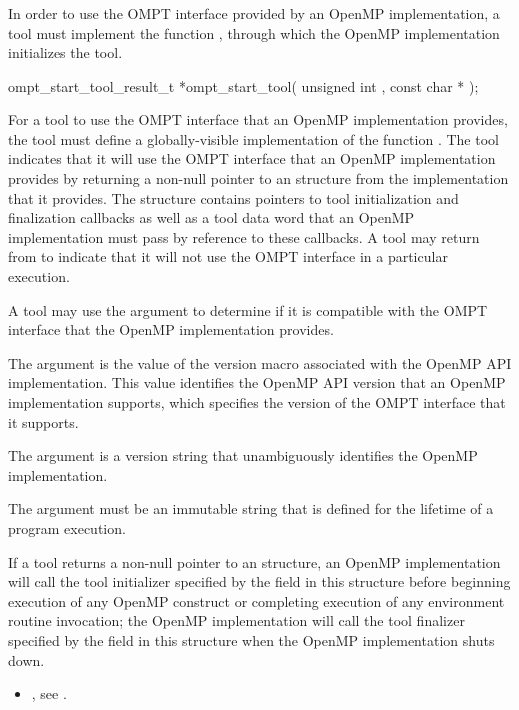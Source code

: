 \subsubsection{}
\label{sec:ompt_start_tool}

\summary
In order to use the OMPT interface provided by an OpenMP implementation,
a tool must implement the function , through which 
the OpenMP implementation initializes the tool.

\format
\begin{cspecific}
\begin{omptOther}
ompt_start_tool_result_t *ompt_start_tool(
  unsigned int ,
  const char *
);
\end{omptOther}
\end{cspecific}

\descr
For a tool to use the OMPT interface that an OpenMP implementation provides,
the tool must define a globally-visible implementation of the
function . The tool indicates that it will use the OMPT 
interface that an OpenMP implementation provides by returning a non-null 
pointer to an  structure from the 
 implementation that it provides. The 
 structure contains pointers to tool 
initialization and finalization callbacks as well as a tool data word 
that an OpenMP implementation must pass by reference to these callbacks. 
A tool may return  from  to indicate 
that it will not use the OMPT interface in a particular execution.

A tool may use the  argument to determine if it is 
compatible with the OMPT interface that the OpenMP implementation provides.

\argdesc
The argument  is the value of the  version macro
associated with the OpenMP API implementation. This value identifies the OpenMP 
API version that an OpenMP implementation supports, which specifies the version 
of the OMPT interface that it supports.

The argument  is a version string that unambiguously 
identifies the OpenMP implementation.

\constraints
The argument  must be an immutable string that is defined 
for the lifetime of a program execution.

\effect
If a tool returns a non-null pointer to an  
structure, an OpenMP implementation will call the tool initializer specified 
by the  field in this structure before beginning execution 
of any OpenMP construct or completing execution of any environment routine 
invocation; the OpenMP implementation will call the tool finalizer specified 
by the  field in this structure when the OpenMP implementation 
shuts down.

\crossreferences
\begin{itemize}
\item {}, see
.
\end{itemize}

